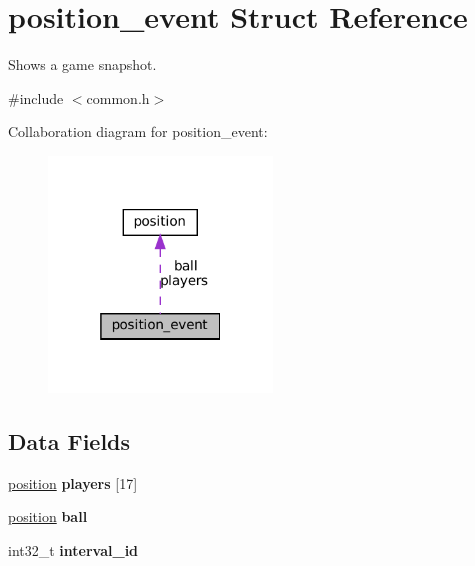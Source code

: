 \hypertarget{structposition__event}{}\section{position\+\_\+event Struct Reference}
\label{structposition__event}


Shows a game snapshot.  




{\ttfamily \#include $<$common.\+h$>$}



Collaboration diagram for position\+\_\+event\+:\nopagebreak
\begin{figure}[H]
\begin{center}
\leavevmode
\includegraphics[width=169pt]{structposition__event__coll__graph}
\end{center}
\end{figure}
\subsection*{Data Fields}
\begin{DoxyCompactItemize}
\item 
\mbox{\label{structposition__event_ae137a84e62d5845fd35ead6cd1514790}} 
\mbox{\hyperlink{structposition}{position}} {\bfseries players} \mbox{[}17\mbox{]}
\item 
\mbox{\label{structposition__event_a3296cf17f9475cc875f7927f6e24afa8}} 
\mbox{\hyperlink{structposition}{position}} {\bfseries ball}
\item 
\mbox{\label{structposition__event_a42b0c3b25fb2f1298e6821d6744063c6}} 
int32\+\_\+t {\bfseries interval\+\_\+id}
\end{DoxyCompactItemize}


